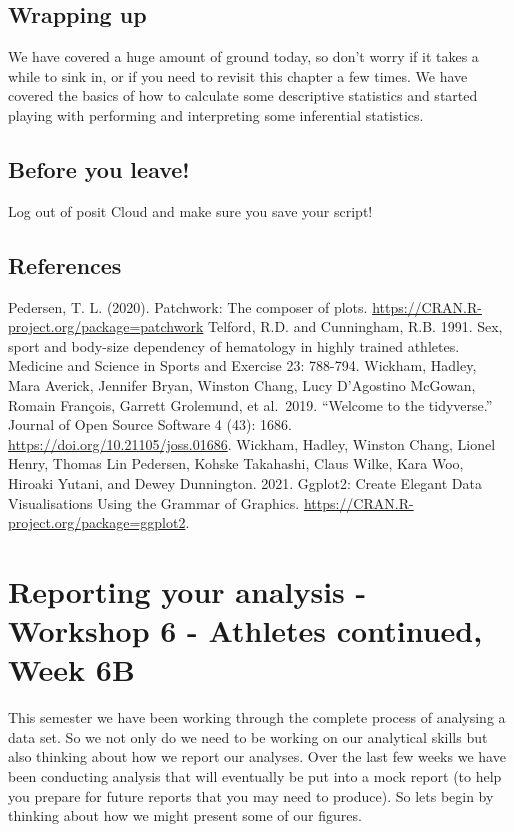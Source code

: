 \documentclass[
]{book}
\begin{document}
\hypertarget{wrapping-up-1}{%
\section{Wrapping up}\label{wrapping-up-1}}

We have covered a huge amount of ground today, so don't worry if it takes a while to sink in, or if you need to revisit this chapter a few times. We have covered the basics of how to calculate some descriptive statistics and started playing with performing and interpreting some inferential statistics.

\hypertarget{before-you-leave-8}{%
\section{Before you leave!}\label{before-you-leave-8}}

Log out of posit Cloud and make sure you save your script!

\hypertarget{references-9}{%
\section{References}\label{references-9}}

Pedersen, T. L. (2020). Patchwork: The composer of plots. \url{https://CRAN.R-project.org/package=patchwork}
Telford, R.D. and Cunningham, R.B. 1991. Sex, sport and body-size dependency of hematology in highly trained athletes. Medicine and Science in Sports and Exercise 23: 788-794.
Wickham, Hadley, Mara Averick, Jennifer Bryan, Winston Chang, Lucy D'Agostino McGowan, Romain François, Garrett Grolemund, et al.~2019. ``Welcome to the tidyverse.'' Journal of Open Source Software 4 (43): 1686. \url{https://doi.org/10.21105/joss.01686}.
Wickham, Hadley, Winston Chang, Lionel Henry, Thomas Lin Pedersen, Kohske Takahashi, Claus Wilke, Kara Woo, Hiroaki Yutani, and Dewey Dunnington. 2021. Ggplot2: Create Elegant Data Visualisations Using the Grammar of Graphics. \url{https://CRAN.R-project.org/package=ggplot2}.

\hypertarget{reporting}{%
\chapter{Reporting your analysis - Workshop 6 - Athletes continued, Week 6B}\label{reporting}}

This semester we have been working through the complete process of analysing a data set. So we not only do we need to be working on our analytical skills but also thinking about how we report our analyses. Over the last few weeks we have been conducting analysis that will eventually be put into a mock report (to help you prepare for future reports that you may need to produce). So lets begin by thinking about how we might present some of our figures.
\end{document}
